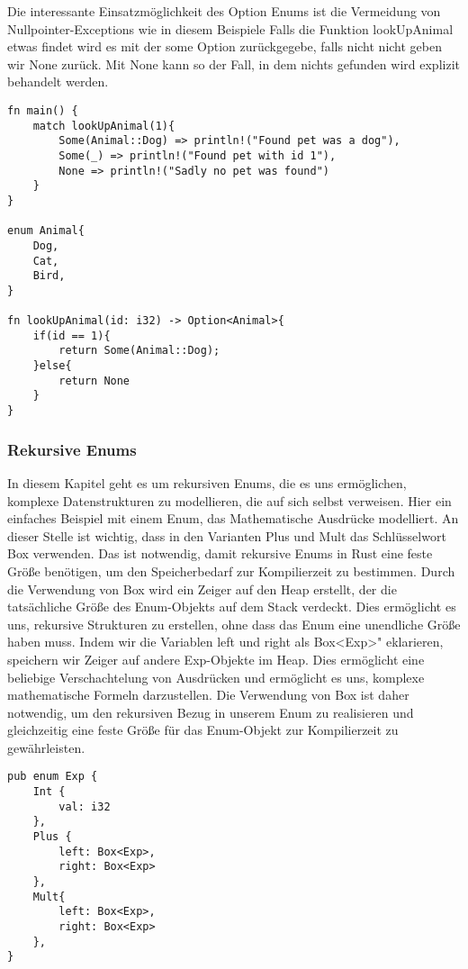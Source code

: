 \documentclass[a4paper, 1ppt]{article}
\begin{document}
Die interessante Einsatzmöglichkeit des Option Enums ist die Vermeidung von Nullpointer-Exceptions wie in diesem Beispiele
Falls die Funktion lookUpAnimal etwas findet wird es mit der some Option zurückgegebe, falls nicht nicht geben wir None zurück. Mit None kann so der Fall, in dem nichts gefunden wird explizit behandelt werden.
\begin{verbatim}
fn main() {
    match lookUpAnimal(1){
        Some(Animal::Dog) => println!("Found pet was a dog"),
        Some(_) => println!("Found pet with id 1"),
        None => println!("Sadly no pet was found")
    }
}

enum Animal{
    Dog,
    Cat,
    Bird,
}

fn lookUpAnimal(id: i32) -> Option<Animal>{
    if(id == 1){
        return Some(Animal::Dog);
    }else{
        return None
    }
}
\end{verbatim}
\subsubsection{Rekursive Enums}
In diesem Kapitel geht es um rekursiven Enums, die es uns ermöglichen, komplexe Datenstrukturen zu modellieren, die auf sich selbst verweisen. 
Hier ein einfaches Beispiel mit einem Enum, das Mathematische Ausdrücke modelliert.
An dieser Stelle ist wichtig, dass in den Varianten Plus und Mult das Schlüsselwort Box verwenden. Das ist notwendig, damit rekursive Enums in Rust eine feste Größe benötigen, um den Speicherbedarf zur Kompilierzeit zu bestimmen. Durch die Verwendung von Box wird ein Zeiger auf den Heap erstellt, der die tatsächliche Größe des Enum-Objekts auf dem Stack verdeckt. Dies ermöglicht es uns, rekursive Strukturen zu erstellen, ohne dass das Enum eine unendliche Größe haben muss.
Indem wir die Variablen left und right als Box<Exp>" eklarieren, speichern wir Zeiger auf andere Exp-Objekte im Heap. Dies ermöglicht eine beliebige Verschachtelung von Ausdrücken und ermöglicht es uns, komplexe mathematische Formeln darzustellen.
Die Verwendung von Box ist daher notwendig, um den rekursiven Bezug in unserem Enum zu realisieren und gleichzeitig eine feste Größe für das Enum-Objekt zur Kompilierzeit zu gewährleisten. 
\newpage
\begin{verbatim}
pub enum Exp {
    Int {
        val: i32
    },
    Plus {
        left: Box<Exp>,
        right: Box<Exp>
    },
    Mult{
        left: Box<Exp>,
        right: Box<Exp>
    },
}
\end{verbatim}
\end{document}
